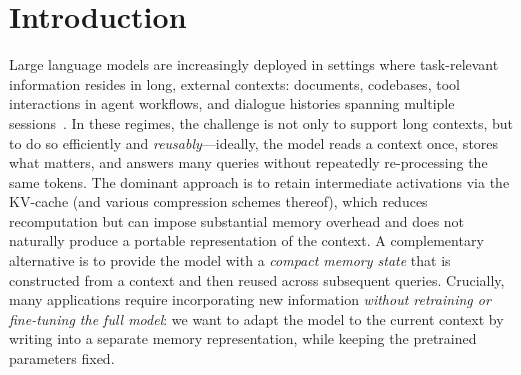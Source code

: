 \documentclass{article}
\theoremstyle{plain}
\theoremstyle{definition}
\theoremstyle{remark}
\begin{document}
\begin{abstract}

\end{abstract}




\section{Introduction}
\label{sec:intro}

Large language models are increasingly deployed in settings where task-relevant information resides in long, external contexts: documents, codebases, tool interactions in agent workflows, and dialogue histories spanning multiple sessions~\citep{lewis2020rag,zhang-etal-2023-repocoder,team2024gemini,kimiteam2026kimik2openagentic}. In these regimes, the challenge is not only to support long contexts, but to do so efficiently and \emph{reusably}---ideally, the model reads a context once, stores what matters, and answers many queries without repeatedly re-processing the same tokens. The dominant approach is to retain intermediate activations via the KV-cache (and various compression schemes thereof), which reduces recomputation but can impose substantial memory overhead and does not naturally produce a portable representation of the context. A complementary alternative is to provide the model with a \emph{compact memory state} that is constructed from a context and then reused across subsequent queries. Crucially, many applications require incorporating new information \emph{without retraining or fine-tuning the full model}: we want to adapt the model to the current context by writing into a separate memory representation, while keeping the pretrained parameters fixed.
\end{document}
